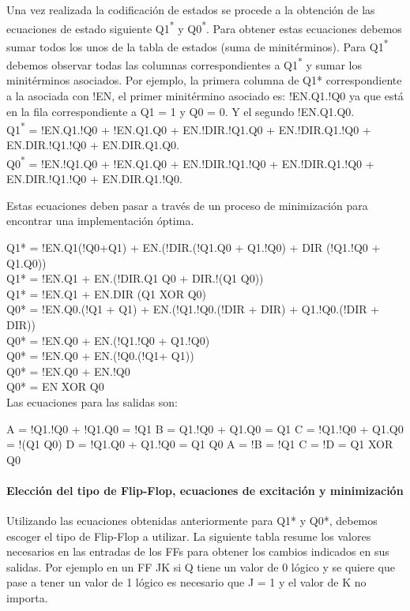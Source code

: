 Una vez realizada la codificación de estados se procede a la obtención de las ecuaciones de estado siguiente Q1\textsuperscript{*} y  Q0\textsuperscript{*}. Para obtener estas ecuaciones debemos sumar todos los unos de la tabla de estados (suma de minitérminos). Para Q1\textsuperscript{*} debemos observar todas las columnas correspondientes a Q1\textsuperscript{*} y sumar los minitérminos asociados. Por ejemplo, la primera columna de Q1* correspondiente a la asociada con !EN, el primer minitérmino asociado es: !EN.Q1.!Q0 ya que está en la fila correspondiente a Q1 = 1 y Q0 = 0. Y el segundo !EN.Q1.Q0. \\

{Q1\textsuperscript{*} = !EN.Q1.!Q0 + !EN.Q1.Q0 + EN.!DIR.!Q1.Q0 + EN.!DIR.Q1.!Q0 + EN.DIR.!Q1.!Q0 + EN.DIR.Q1.Q0.\\
Q0\textsuperscript{*} = !EN.!Q1.Q0 + !EN.Q1.Q0 + EN.!DIR.!Q1.!Q0 + EN.!DIR.Q1.!Q0 + EN.DIR.!Q1.!Q0 + EN.DIR.Q1.!Q0.}

Estas ecuaciones deben pasar a través de un proceso de minimización para encontrar una implementación óptima.

Q1* = !EN.Q1(!Q0+Q1) + EN.(!DIR.(!Q1.Q0 + Q1.!Q0) + DIR (!Q1.!Q0 + Q1.Q0)) \\
Q1* = !EN.Q1 + EN.(!DIR.Q1 Q0 + DIR.!(Q1 Q0)) \\
Q1* = !EN.Q1 + EN.DIR (Q1 XOR Q0) \\
Q0* = !EN.Q0.(!Q1 + Q1) + EN.(!Q1.!Q0.(!DIR + DIR) + Q1.!Q0.(!DIR + DIR)) \\
Q0* = !EN.Q0 + EN.(!Q1.!Q0 + Q1.!Q0) \\
Q0* = !EN.Q0 + EN.(!Q0.(!Q1+ Q1)) \\
Q0* = !EN.Q0 + EN.!Q0 \\
Q0* = EN XOR Q0 \\

Las ecuaciones para las salidas son:

{A = !Q1.!Q0 + !Q1.Q0 = !Q1}
{B = Q1.!Q0 + Q1.Q0 = Q1}
{C = !Q1.!Q0 + Q1.Q0 = !(Q1 Q0)}
{D = !Q1.Q0 + Q1.!Q0 = Q1 Q0}
{A = !B = !Q1}
{C = !D = Q1 XOR Q0}

\paragraph[Elección del tipo de Flip{}-Flop, ecuaciones de excitación y minimización]{ Elección del tipo de Flip-Flop, ecuaciones de excitación y minimización}

Utilizando las ecuaciones obtenidas anteriormente para Q1* y Q0*, debemos escoger el tipo de Flip-Flop a utilizar. La siguiente tabla resume los valores necesarios en las entradas de los FFs para obtener los cambios indicados en sus salidas. Por ejemplo en un FF JK si Q tiene un valor de 0 lógico y se quiere que pase a tener un valor de 1 lógico es necesario que J = 1 y el valor de K no importa.

